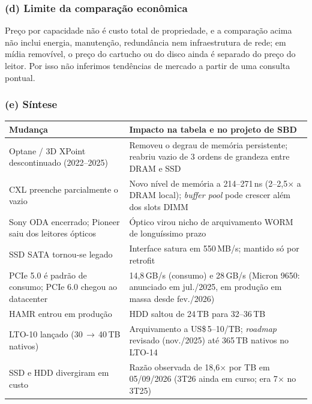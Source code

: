 \documentclass[11pt,a4paper]{article}
\begin{document}
\subsubsection*{(d) Limite da comparação econômica}

Preço por capacidade não é custo total de propriedade, e a comparação acima não inclui energia,
manutenção, redundância nem infraestrutura de rede; em mídia removível, o preço do cartucho ou do
disco ainda é separado do preço do leitor. Por isso não inferimos tendências de mercado a partir de
uma consulta pontual.

\subsubsection*{(e) Síntese}

\begin{center}\small
\begin{tabular}{@{}p{6.2cm}p{9.0cm}@{}}
\toprule
\textbf{Mudança} & \textbf{Impacto na tabela e no projeto de SBD} \\
\midrule
Optane / 3D XPoint descontinuado (2022--2025) & Removeu o degrau de memória persistente; reabriu vazio de 3 ordens de grandeza entre DRAM e SSD \\
CXL preenche parcialmente o vazio & Novo nível de memória a 214--271\,ns (2--2,5$\times$ a DRAM local); \emph{buffer pool} pode crescer além dos slots DIMM \\
Sony ODA encerrado; Pioneer saiu dos leitores ópticos & Óptico virou nicho de arquivamento WORM de longuíssimo prazo \\
SSD SATA tornou-se legado & Interface satura em 550\,MB/s; mantido só por retrofit \\
PCIe 5.0 é padrão de consumo; PCIe 6.0 chegou ao datacenter & 14,8\,GB/s (consumo) e 28\,GB/s (Micron 9650: anunciado em jul./2025, em produção em massa desde fev./2026) \\
HAMR entrou em produção & HDD saltou de 24\,TB para 32--36\,TB \\
LTO-10 lançado (30\,$\rightarrow$\,40\,TB nativos) & Arquivamento a US\$\,5--10/TB; \emph{roadmap} revisado (nov./2025) até 365\,TB nativos no LTO-14 \\
SSD e HDD divergiram em custo & Razão observada de 18,6$\times$ por TB em 05/09/2026 (3T26 ainda em curso; era 7$\times$ no 3T25) \\
\bottomrule
\end{tabular}
\end{center}
\end{document}
